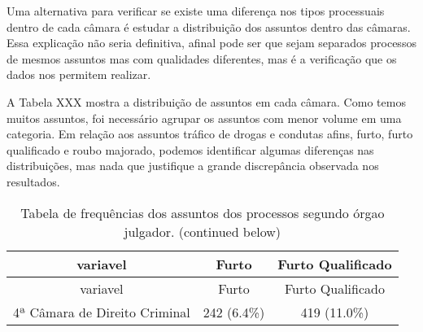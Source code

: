 \documentclass[10pt,]{article}
\begin{document}
Uma alternativa para verificar se existe uma diferença nos tipos
processuais dentro de cada câmara é estudar a distribuição dos assuntos
dentro das câmaras. Essa explicação não seria definitiva, afinal pode
ser que sejam separados processos de mesmos assuntos mas com qualidades
diferentes, mas é a verificação que os dados nos permitem realizar.

A Tabela XXX mostra a distribuição de assuntos em cada câmara. Como
temos muitos assuntos, foi necessário agrupar os assuntos com menor
volume em uma categoria. Em relação aos assuntos tráfico de drogas e
condutas afins, furto, furto qualificado e roubo majorado, podemos
identificar algumas diferenças nas distribuições, mas nada que
justifique a grande discrepância observada nos resultados.

\begin{longtable}[c]{@{}ccc@{}}
\caption{Tabela de frequências dos assuntos dos processos segundo órgao
julgador. (continued below)}\tabularnewline
\toprule
\begin{minipage}[b]{0.39\columnwidth}\centering\strut
variavel
\strut\end{minipage} &
\begin{minipage}[b]{0.16\columnwidth}\centering\strut
Furto
\strut\end{minipage} &
\begin{minipage}[b]{0.24\columnwidth}\centering\strut
Furto Qualificado
\strut\end{minipage}\tabularnewline
\midrule
\endfirsthead
\toprule
\begin{minipage}[b]{0.39\columnwidth}\centering\strut
variavel
\strut\end{minipage} &
\begin{minipage}[b]{0.16\columnwidth}\centering\strut
Furto
\strut\end{minipage} &
\begin{minipage}[b]{0.24\columnwidth}\centering\strut
Furto Qualificado
\strut\end{minipage}\tabularnewline
\midrule
\endhead
\begin{minipage}[t]{0.39\columnwidth}\centering\strut
4ª Câmara de Direito Criminal
\strut\end{minipage} &
\begin{minipage}[t]{0.16\columnwidth}\centering\strut
242 (6.4\%)
\strut\end{minipage} &
\begin{minipage}[t]{0.24\columnwidth}\centering\strut
419 (11.0\%)
\strut\end{minipage}\tabularnewline

\end{longtable}
\end{document}
